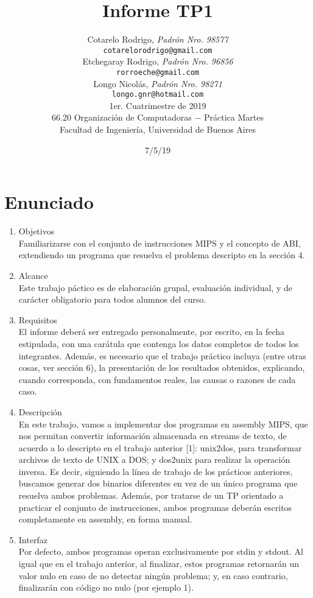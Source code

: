 \documentclass[a4paper,11pt]{article}
\title{		\textbf{Informe TP1}}
\author{	Cotarelo Rodrigo, \textit{Padrón Nro. 98577}                     \\
            \texttt{ cotarelorodrigo@gmail.com }                                              \\[2.5ex]
            Etchegaray Rodrigo, \textit{Padrón Nro. 96856}                     \\
            \texttt{ rorroeche@gmail.com }                                              \\[2.5ex]
			Longo Nicolás, \textit{Padrón Nro. 98271}                    
\\
            \texttt{ longo.gnr@hotmail.com }                                              \\[2.5ex]
            \normalsize{1er. Cuatrimestre de 2019}                                      \\
            \normalsize{66.20 Organización de Computadoras  $-$ Práctica Martes}  \\
            \normalsize{Facultad de Ingeniería, Universidad de Buenos Aires}            \\
       }
\date{7/5/19}
\begin{document}
\maketitle
\thispagestyle{empty}   %
\newpage

\section{Enunciado}

\begin{enumerate}
\item Objetivos \\
Familiarizarse con el conjunto de instrucciones MIPS y el concepto de ABI,
extendiendo un programa que resuelva el problema descripto en la secci\'on 4.

\item Alcance \\
Este trabajo p\'actico es de elaboraci\'on grupal, evaluaci\'on individual, y de
car\'acter obligatorio para todos alumnos del curso.

\item Requisitos \\
El informe deber\'a ser entregado personalmente, por escrito, en la fecha
estipulada, con una car\'atula que contenga los datos completos de todos los
integrantes.
Adem\'as, es necesario que el trabajo pr\'actico incluya (entre otras cosas,
ver secci\'on 6), la presentaci\'on de los resultados obtenidos, explicando, cuando
corresponda, con fundamentos reales, las causas o razones de cada caso.

\item Descripci\'on \\
En este trabajo, vamos a implementar dos programas en assembly MIPS,
que nos permitan convertir informaci\'on almacenada en streams de texto, de
acuerdo a lo descripto en el trabajo anterior [1]: unix2dos, para transformar
archivos de texto de UNIX a DOS; y dos2unix para realizar la operaci\'on inversa.
Es decir, siguiendo la l\'inea de trabajo de los pr\'acticos anteriores, buscamos
generar dos binarios diferentes en vez de un \'unico programa que resuelva
ambos problemas. Adem\'as, por tratarse de un TP orientado a practicar el
conjunto de instrucciones, ambos programas deber\'an escritos completamente
en assembly, en forma manual.

\item Interfaz \\
Por defecto, ambos programas operan exclusivamente por stdin y stdout.
Al igual que en el trabajo anterior, al finalizar, estos programas retornar\'an
un valor nulo en caso de no detectar ning\'un problema; y, en caso contrario,
finalizar\'an con c\'odigo no nulo (por ejemplo 1).



\end{enumerate}
\end{document}
